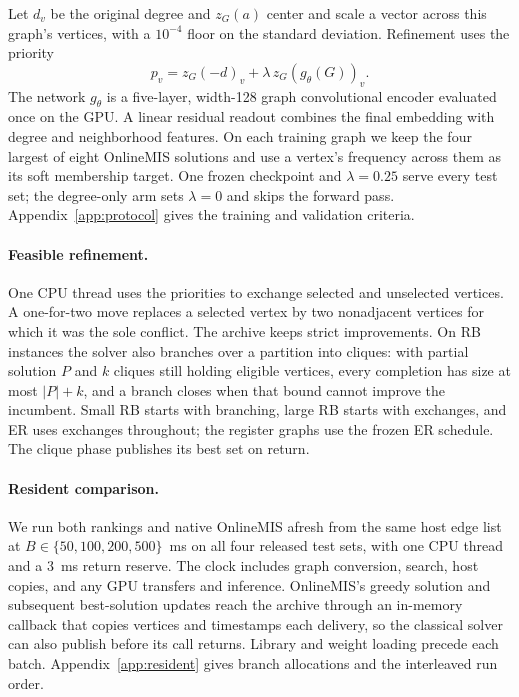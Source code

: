 Let \(d_v\) be the original degree and \(z_G(a)\) center and scale a vector across this graph's vertices, with a \(10^{-4}\) floor on the standard deviation. Refinement uses the priority
\begin{equation}
 p_v=z_G(-d)_v+\lambda\,z_G(g_\theta(G))_v .
 \label{eq:priority}
\end{equation}
The network \(g_\theta\) is a five-layer, width-128 graph convolutional encoder evaluated once on the GPU. A linear residual readout combines the final embedding with degree and neighborhood features. On each training graph we keep the four largest of eight OnlineMIS solutions and use a vertex's frequency across them as its soft membership target. One frozen checkpoint and \(\lambda=0.25\) serve every test set; the degree-only arm sets \(\lambda=0\) and skips the forward pass. Appendix~\ref{app:protocol} gives the training and validation criteria.

\paragraph{Feasible refinement.}
One CPU thread uses the priorities to exchange selected and unselected vertices. A one-for-two move replaces a selected vertex by two nonadjacent vertices for which it was the sole conflict. The archive keeps strict improvements. On RB instances the solver also branches over a partition into cliques: with partial solution \(P\) and \(k\) cliques still holding eligible vertices, every completion has size at most \(|P|+k\), and a branch closes when that bound cannot improve the incumbent. Small RB starts with branching, large RB starts with exchanges, and ER uses exchanges throughout; the register graphs use the frozen ER schedule. The clique phase publishes its best set on return.

\paragraph{Resident comparison.}
We run both rankings and native OnlineMIS afresh from the same host edge list at \(B\in\{50,100,200,500\}\)~ms on all four released test sets, with one CPU thread and a 3~ms return reserve. The clock includes graph conversion, search, host copies, and any GPU transfers and inference. OnlineMIS's greedy solution and subsequent best-solution updates reach the archive through an in-memory callback that copies vertices and timestamps each delivery, so the classical solver can also publish before its call returns. Library and weight loading precede each batch. Appendix~\ref{app:resident} gives branch allocations and the interleaved run order.


